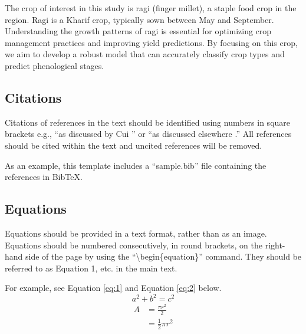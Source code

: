 \documentclass{article}
\begin{document}
The crop of interest in this study is ragi (finger millet), a staple food crop in the region. Ragi is a Kharif crop, typically sown between May and September. Understanding the growth patterns of ragi is essential for optimizing crop management practices and improving yield predictions. By focusing on this crop, we aim to develop a robust model that can accurately classify crop types and predict phenological stages.
\subsection*{Citations}
Citations of references in the text should be identified using numbers in square brackets e.g., ``as discussed by Cui \cite{Cui1}'' or ``as discussed elsewhere \cite{Cui1,Ninomiya1,Li1,Wang1,Yang1}.'' All references should be cited within the text and uncited references will be removed. 

As an example, this template includes a ``sample.bib'' file containing the references in BibTeX.

\subsection*{Equations}
Equations should be provided in a text format, rather than as an image. Equations should be numbered consecutively, in round brackets, on the right-hand side of the page by using the ``\textbackslash begin\{equation\}'' command. They should be referred to as Equation 1, etc. in the main text.

\medskip For example, see Equation \ref{eq:1} and Equation \ref{eq:2} below.
\begin{equation} \label{eq:1}
    a^2 + b^2 = c^2
\end{equation}
\begin{equation} \label{eq:2}
\begin{split}
A & = \frac{\pi r^2}{2} \\
 & = \frac{1}{2} \pi r^2
\end{split}
\end{equation}

\end{document}
